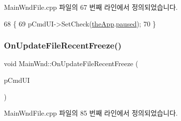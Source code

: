 Main\+Wnd\+File.\+cpp 파일의 67 번째 라인에서 정의되었습니다.


\begin{DoxyCode}
68 \{
69   pCmdUI->SetCheck(\mbox{\hyperlink{_v_b_a_8cpp_a8095a9d06b37a7efe3723f3218ad8fb3}{theApp}}.\mbox{\hyperlink{class_v_b_a_af7447bf3bf3f93948d2757e4cb223cfc}{paused}});  
70 \}
\end{DoxyCode}
\mbox{\label{class_main_wnd_a105c377d7748cfb083db564e0f545383}} 
\subsubsection{\texorpdfstring{On\+Update\+File\+Recent\+Freeze()}{OnUpdateFileRecentFreeze()}}
{\footnotesize\ttfamily void Main\+Wnd\+::\+On\+Update\+File\+Recent\+Freeze (\begin{DoxyParamCaption}\item[{C\+Cmd\+UI $\ast$}]{p\+Cmd\+UI }\end{DoxyParamCaption})\hspace{0.3cm}{\ttfamily [protected]}}



Main\+Wnd\+File.\+cpp 파일의 85 번째 라인에서 정의되었습니다.


